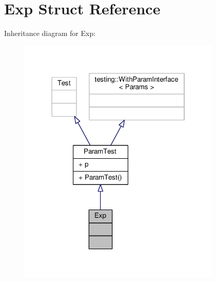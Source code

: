 \hypertarget{struct_exp}{}\section{Exp Struct Reference}
\label{struct_exp}


Inheritance diagram for Exp\+:
\nopagebreak
\begin{figure}[H]
\begin{center}
\leavevmode
\includegraphics[width=274pt]{struct_exp__inherit__graph}
\end{center}
\end{figure}


